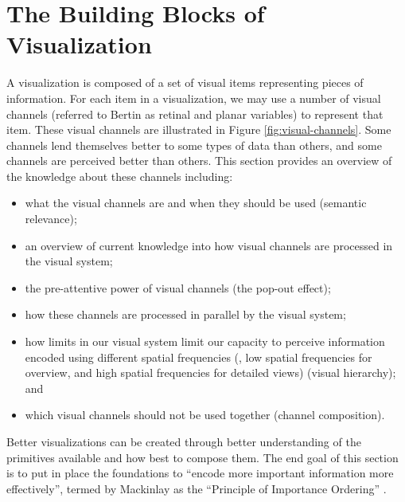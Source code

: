 
\section{The Building Blocks of Visualization}
A visualization is composed of a set of visual items representing pieces of information. 
For each item in a visualization, we may use a number of visual channels\cite{Bertin:1983:book} (referred to Bertin as retinal and planar variables) to represent that item. 
These visual channels are illustrated in Figure \ref{fig:visual-channels}. 
Some channels lend themselves better to some types of data than others, and some channels are perceived better than others.
This section provides an overview of the knowledge about these channels including: 
\begin{itemize}
\item what the visual channels are and when they should be used (semantic relevance); 
\item an overview of current knowledge into how visual channels are processed in the visual system; 
\item the pre-attentive power of visual channels (the pop-out effect); 
\item how these channels are processed in parallel by the visual system;
\item how limits in our visual system limit our capacity to perceive information encoded using different spatial frequencies (\eg, low spatial frequencies for overview, and high spatial frequencies for detailed views) (visual hierarchy); and 
\item which visual channels should not be used together (channel composition). 
\end{itemize}
Better visualizations can be created through better understanding of the primitives available and how best to compose them. 
The end goal of this section is to put in place the foundations to ``encode more important information more effectively'', termed by Mackinlay as the ``Principle of Importance Ordering'' \cite{mackinlay1986automating}.

